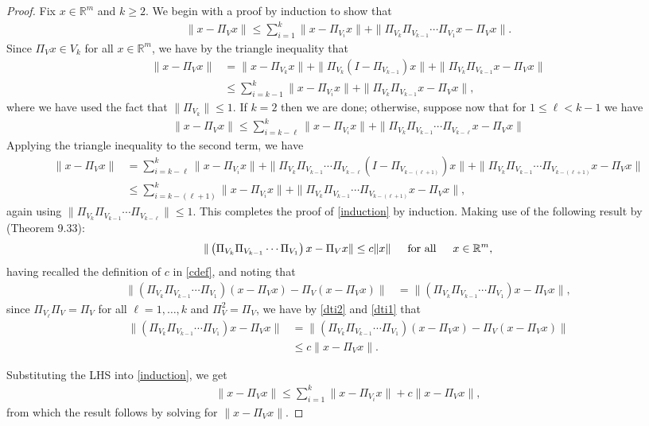 \documentclass[journal, onecolumn]{IEEEtran}
\begin{document}
\begin{proof} 
Fix $x \in \mathbb{R}^m$ and $k \geq 2$. We begin with a proof by induction to show that
\begin{align}\label{induction}
\|x - \Pi_Vx\| \leq \sum_{i=1}^k \|x - \Pi_{V_i} x\| + \|\Pi_{V_k}\Pi_{V_{k-1}}\cdots\Pi_{V_1} x - \Pi_V x\|.
\end{align}
%
Since $\Pi_Vx \in V_k$ for all $x \in \mathbb{R}^m$, we have by the triangle inequality that
\begin{align*}
\|x - \Pi_Vx\| &= \|x - \Pi_{V_k} x\| + \|\Pi_{V_k}(I - \Pi_{V_{k-1}}) x\| + \|\Pi_{V_k}\Pi_{V_{k-1}}x - \Pi_Vx\| \\
&\leq \sum_{i=k-1}^k\|x - \Pi_{V_i} x\| + \|\Pi_{V_k}\Pi_{V_{k-1}} x - \Pi_V x\|,
\end{align*}
%
where we have used the fact that $\|\Pi_{V_k}\| \leq 1$. If $k=2$ then we are done; otherwise, suppose now that for $1 \leq \ell < k-1$ we have
\begin{align*}
\|x-\Pi_V x\| \leq \sum_{i=k - \ell}^k \|x - \Pi_{V_i} x\| + \|\Pi_{V_{k}}\Pi_{V_{k-1}}\cdots\Pi_{V_{k-\ell}} x - \Pi_V x\|
\end{align*}
Applying the triangle inequality to the second term, we have
\begin{align*}
\|x-\Pi_V x\| &= \sum_{i=k-\ell}^{k} \|x - \Pi_{V_i} x\| 
+ \| \Pi_{V_{k}}\Pi_{V_{k-1}}\cdots\Pi_{V_{k-\ell}} (I - \Pi_{V_{k-(\ell+1)}}) x \| 
+ \|\Pi_{V_k}\Pi_{V_{k-1}}\cdots\Pi_{V_{k-(\ell+1)}} x - \Pi_V x\| \\
&\leq \sum_{i=k-(\ell+1)}^k \|x - \Pi_{V_i} x\| + \|\Pi_{V_k}\Pi_{V_{k-1}}\cdots\Pi_{V_{k-(\ell+1)}} x - \Pi_V x\|,
\end{align*}
%
again using $\|\Pi_{V_{k}}\Pi_{V_{k-1}}\cdots\Pi_{V_{k-\ell}}\| \leq 1$. This completes the proof of \eqref{induction} by induction. Making use of the following result by \cite{Deutsch} (Theorem 9.33):
\begin{align}\label{dti2}
\|\left(\Pi_{V_k}\Pi_{V_{k-1}}\cdots\Pi_{V_1}\right)x - \Pi_Vx\| \leq c\|x\| \indent \text{for all} \indent x \in \mathbb{R}^m,
\end{align}
%
having recalled the definition of $c$ in \eqref{cdef}, and noting that
\begin{align}\label{dti1}
\|(\Pi_{V_k}\Pi_{V_{k-1}}\cdots\Pi_{V_1})(x - \Pi_Vx) - \Pi_V(x - \Pi_Vx)\| 
&= \|(\Pi_{V_k}\Pi_{V_{k-1}}\cdots\Pi_{V_1}) x - \Pi_V x \|,
\end{align}
%
since $\Pi_{V_\ell} \Pi_V = \Pi_V$ for all $\ell = 1, \ldots, k$ and $\Pi_V^2 = \Pi_V$,
%
we have by \eqref{dti2} and \eqref{dti1} that
\begin{align*}
\|(\Pi_{V_k}\Pi_{V_{k-1}}\cdots\Pi_{V_1}) x - \Pi_V x \| 
&= \|(\Pi_{V_k}\Pi_{V_{k-1}}\cdots\Pi_{V_1})(x - \Pi_Vx) - \Pi_V(x - \Pi_Vx)\| \\
&\leq c \|x - \Pi_Vx\|.
\end{align*}

Substituting the LHS into \eqref{induction}, we get
\begin{align*}
\|x - \Pi_Vx\| \leq \sum_{i=1}^k \|x - \Pi_{V_i} x\|+ c \|x - \Pi_Vx\|,
\end{align*}
%
from which the result follows by solving for $\|x - \Pi_Vx\|$.
\end{proof}
\end{document}
